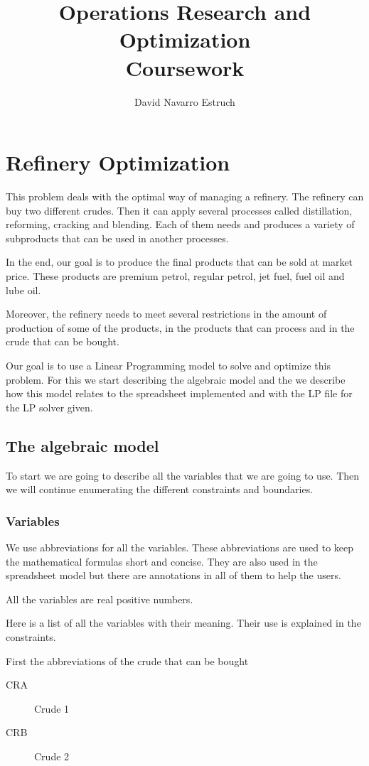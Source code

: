 \documentclass[12pt,a4paper]{report}
\author{David Navarro Estruch}
\title{Operations Research and Optimization \\ Coursework}
\begin{document}
\maketitle
\chapter{Refinery Optimization}
This problem deals with the optimal way of managing a refinery. The refinery can buy two different crudes. Then it can apply several processes called distillation, reforming, cracking and blending. Each of them needs and produces a variety of subproducts that can be used in another processes.

In the end, our goal is to produce the final products that can be sold at market price. These products are premium petrol, regular petrol, jet fuel, fuel oil and lube oil.

Moreover, the refinery needs to meet several restrictions in the amount of production of some of the products, in the products that can process and in the  crude that can be bought.

Our goal is to use a Linear Programming model to solve and optimize this problem. For this we start describing the algebraic model and the we describe how this model relates to the spreadsheet implemented and with the LP file for the LP solver given.

\section{The algebraic model}
To start we are going to describe all the variables that we are going to use. Then we will continue enumerating the different constraints and boundaries.
\subsection{Variables}
We use abbreviations for all the variables. These abbreviations are used to keep the mathematical formulas short and concise. They are also used in the spreadsheet model but there are annotations in all of them to help the users.

All the variables are real positive numbers.

Here is a list of all the variables with their meaning. Their use is explained in the constraints.

First the abbreviations of the crude that can be bought
\begin{description}
\item[CRA]
Crude 1
\item[CRB]
Crude 2
\end{description}
\end{document}
